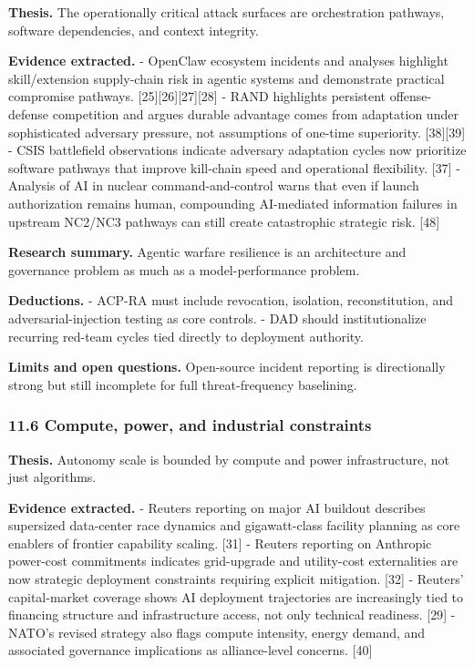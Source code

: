 \documentclass[11pt]{article}
\begin{document}
\textbf{Thesis.} The operationally critical attack surfaces are
orchestration pathways, software dependencies, and context integrity.

\textbf{Evidence extracted.} - OpenClaw ecosystem incidents and analyses
highlight skill/extension supply-chain risk in agentic systems and
demonstrate practical compromise pathways.
{[}25{]}{[}26{]}{[}27{]}{[}28{]} - RAND highlights persistent
offense-defense competition and argues durable advantage comes from
adaptation under sophisticated adversary pressure, not assumptions of
one-time superiority. {[}38{]}{[}39{]} - CSIS battlefield observations
indicate adversary adaptation cycles now prioritize software pathways
that improve kill-chain speed and operational flexibility. {[}37{]} -
Analysis of AI in nuclear command-and-control warns that even if launch
authorization remains human, compounding AI-mediated information
failures in upstream NC2/NC3 pathways can still create catastrophic
strategic risk. {[}48{]}

\textbf{Research summary.} Agentic warfare resilience is an architecture
and governance problem as much as a model-performance problem.

\textbf{Deductions.} - ACP-RA must include revocation, isolation,
reconstitution, and adversarial-injection testing as core controls. -
DAD should institutionalize recurring red-team cycles tied directly to
deployment authority.

\textbf{Limits and open questions.} Open-source incident reporting is
directionally strong but still incomplete for full threat-frequency
baselining.

\hypertarget{compute-power-and-industrial-constraints}{%
\subsubsection{11.6 Compute, power, and industrial
constraints}\label{compute-power-and-industrial-constraints}}

\textbf{Thesis.} Autonomy scale is bounded by compute and power
infrastructure, not just algorithms.

\textbf{Evidence extracted.} - Reuters reporting on major AI buildout
describes supersized data-center race dynamics and gigawatt-class
facility planning as core enablers of frontier capability scaling.
{[}31{]} - Reuters reporting on Anthropic power-cost commitments
indicates grid-upgrade and utility-cost externalities are now strategic
deployment constraints requiring explicit mitigation. {[}32{]} -
Reuters' capital-market coverage shows AI deployment trajectories are
increasingly tied to financing structure and infrastructure access, not
only technical readiness. {[}29{]} - NATO's revised strategy also flags
compute intensity, energy demand, and associated governance implications
as alliance-level concerns. {[}40{]}
\end{document}
